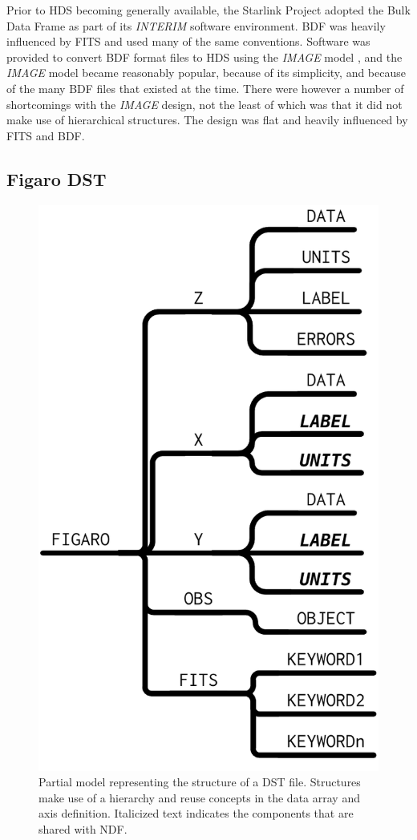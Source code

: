 \documentclass[final,authoryear,5p,times,twocolumn]{elsarticle}
\begin{document}
Prior to HDS becoming generally available, the Starlink Project adopted
the Bulk Data Frame \citep[BDF;][]{1980SPIE..264...70P,SUN4} as part
of its \emph{INTERIM} software environment.  BDF was heavily influenced
by FITS and used many of the same conventions.  Software was provided
to convert BDF format files to HDS using the \emph{IMAGE} model
\citep{SUN96}, and
the \emph{IMAGE} model became reasonably popular, because of its
simplicity, and because of the many BDF files that existed at the time.
There were however
a number of shortcomings with the \emph{IMAGE} design, not the least of which was
that it did not make use of hierarchical structures. The design was
flat and heavily influenced by FITS and BDF.

\subsection{Figaro DST}
\label{app:figaro}

\begin{figure}[t]
\begin{center}
\includegraphics[width=0.6\columnwidth]{model-dst}
\end{center}
\caption{Partial model representing the structure of a DST file. Structures make
  use of a hierarchy and reuse concepts in the data array and axis
  definition.  Italicized text indicates the components that are shared with NDF.}
\label{fig:dst}
\end{figure}
\end{document}
